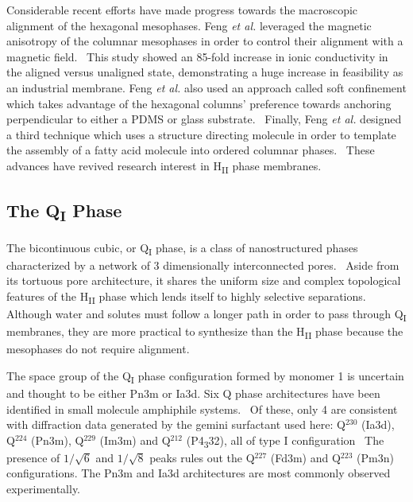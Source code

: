   Considerable recent efforts have made progress towards the macroscopic
  alignment of the hexagonal mesophases. Feng \textit{et al.} leveraged the magnetic 
  anisotropy of the columnar mesophases in order to control their alignment with a 
  magnetic field.~\cite{feng_scalable_2014} This study showed an 85-fold increase in
  ionic conductivity in the aligned versus unaligned state, demonstrating a huge 
  increase in feasibility as an industrial membrane. Feng \textit{et al.} also used
  an approach called soft confinement which takes advantage of the hexagonal columns'
  preference towards anchoring perpendicular to either a PDMS or glass substrate.~\cite{feng_thin_2016}
  Finally, Feng \textit{et al.} designed a third technique which uses a structure
  directing molecule in order to template the assembly of a fatty acid 
  molecule into ordered columnar phases.~\cite{feng_highly_2017} These advances 
  have revived research interest in H\textsubscript{II} phase membranes.
  
  \subsection{The Q\textsubscript{I} Phase}
  
  The bicontinuous cubic, or Q\textsubscript{I} phase, is a class of nanostructured
  phases characterized by a network of 3 dimensionally interconnected pores.~\cite{hyde_bicontinuous_1996}
  Aside from its tortuous pore architecture, it shares the uniform size and complex 
  topological features of the H\textsubscript{II} phase which lends itself to highly
  selective separations. Although water and solutes must follow a longer path in order
  to pass through Q\textsubscript{I} membranes, they are more practical to synthesize
  than the H\textsubscript{II} phase because the mesophases do not require alignment.~\cite{zhou_new_2007}
  
  
  The space group of the Q\textsubscript{I} phase configuration formed by
  monomer 1 is uncertain and thought to be either Pn3m or Ia3d. Six Q phase
  architectures have been identified in small molecule amphiphile systems.~\cite{mariani_cubic_1988}
  Of these, only 4 are consistent with diffraction data generated by the gemini
  surfactant used here: Q$^{230}$ (Ia3d), Q$^{224}$ (Pn3m), Q$^{229}$ (Im3m) and Q$^{212}$ 
  (P4\textsubscript{3}32), all of type I configuration~\cite{pindzola_cross-linked_2003}
  The presence of $1 / \sqrt{6}$ and $1 / \sqrt{8}$ peaks rules out the
  Q$^{227}$ (Fd3m) and Q$^{223}$ (Pm3n) configurations. The Pn3m and Ia3d architectures
  are most commonly observed experimentally.~\cite{mariani_cubic_1988,wiesenauer_nanoporous_2012}

